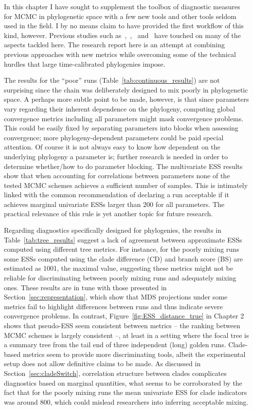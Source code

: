 In this chapter I have sought to supplement the toolbox of diagnostic measures for MCMC in phylogenetic space with a few new tools and other tools seldom used in the field.
I by no means claim to have provided the first workflow of this kind, however.
Previous studies such as~\cite{Hillis2005},~\cite{Lakner2008},~\cite{Nylander2008} and~\cite{Warren2017} have touched on many of the aspects tackled here.
The research report here is an attempt at combining previous approaches with new metrics while overcoming some of the technical hurdles that large time-calibrated phylogenies impose.

The results for the ``poor'' runs (Table~\ref{tab:continuous_results}) are not surprising since the chain was deliberately designed to mix poorly in phylogenetic space.
A perhaps more subtle point to be made, however, is that since parameters vary regarding their inherent dependence on the phylogeny, computing global convergence metrics including all parameters might mask convergence problems.
This could be easily fixed by separating parameters into blocks when assessing convergence; more phylogeny-dependent parameters could be paid special attention.
Of course it is not always easy to know how dependent on the underlying phylogeny a parameter is; further research is needed in order to determine whether/how to do parameter blocking.
The multivariate ESS results show that when accounting for correlations between parameters none of the tested MCMC schemes achieves a sufficient number of samples.
This is intimately linked with the common recommendation of declaring a run acceptable if it achieves marginal univariate ESSs larger than $200$ for all parameters.
The practical relevance of this rule is yet another topic for future research.

Regarding diagnostics specifically designed for phylogenies, the results in Table~\ref{tab:tree_results} suggest a lack of agreement between approximate ESSs computed using different tree metrics.
For instance, for the poorly mixing runs some ESSs computed using the clade difference (CD) and branch score (BS) are estimated as 1001, the maximal value, suggesting these metrics might not be reliable for discriminating between poorly mixing runs and adequately mixing ones.
These results are in tune with those presented in Section~\ref{sec:representation}, which show that MDS projections under some metrics fail to highlight differences between runs and thus indicate severe convergence problems. 
In contrast, Figure~\ref{fig:ESS_distance_true} in Chapter 2 shows that pseudo-ESS seem consistent between metrics -- the ranking between MCMC schemes is largely consistent --, at least in a setting where the focal tree is a summary tree from the tail end of three independent (long) golden runs.
Clade-based metrics seem to provide more discriminating tools, albeit the experimental setup does not allow definitive claims to be made.
As discussed in Section~\ref{sec:cladeSwitch}, correlation structure between clades complicates diagnostics based on marginal quantities, what seems to be corroborated by the fact that for the poorly mixing runs the mean univariate ESS for clade indicators was around $800$, which could mislead researchers into inferring acceptable mixing.

